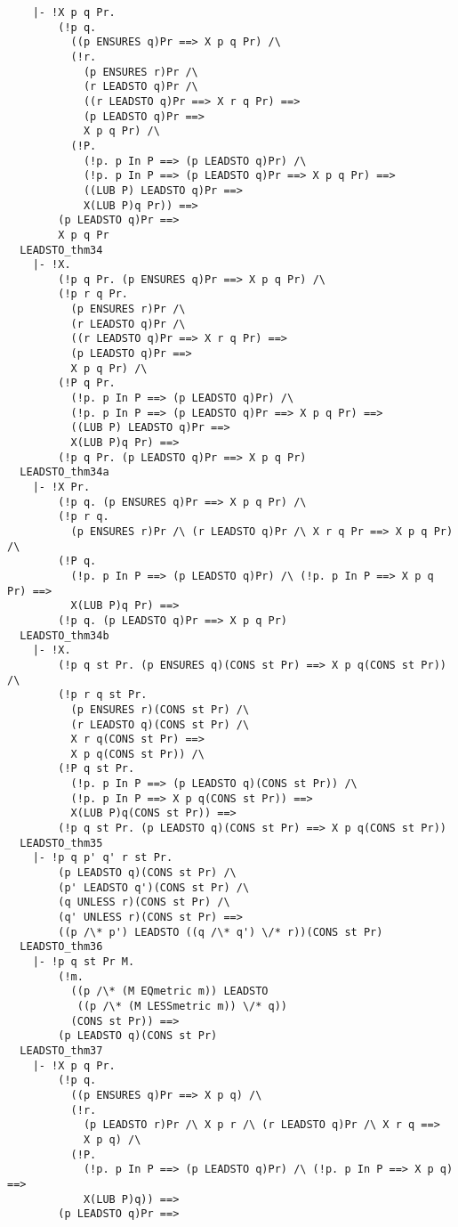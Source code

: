{\begin{verbatim}
    |- !X p q Pr.
        (!p q.
          ((p ENSURES q)Pr ==> X p q Pr) /\
          (!r.
            (p ENSURES r)Pr /\
            (r LEADSTO q)Pr /\
            ((r LEADSTO q)Pr ==> X r q Pr) ==>
            (p LEADSTO q)Pr ==>
            X p q Pr) /\
          (!P.
            (!p. p In P ==> (p LEADSTO q)Pr) /\
            (!p. p In P ==> (p LEADSTO q)Pr ==> X p q Pr) ==>
            ((LUB P) LEADSTO q)Pr ==>
            X(LUB P)q Pr)) ==>
        (p LEADSTO q)Pr ==>
        X p q Pr
  LEADSTO_thm34
    |- !X.
        (!p q Pr. (p ENSURES q)Pr ==> X p q Pr) /\
        (!p r q Pr.
          (p ENSURES r)Pr /\
          (r LEADSTO q)Pr /\
          ((r LEADSTO q)Pr ==> X r q Pr) ==>
          (p LEADSTO q)Pr ==>
          X p q Pr) /\
        (!P q Pr.
          (!p. p In P ==> (p LEADSTO q)Pr) /\
          (!p. p In P ==> (p LEADSTO q)Pr ==> X p q Pr) ==>
          ((LUB P) LEADSTO q)Pr ==>
          X(LUB P)q Pr) ==>
        (!p q Pr. (p LEADSTO q)Pr ==> X p q Pr)
  LEADSTO_thm34a
    |- !X Pr.
        (!p q. (p ENSURES q)Pr ==> X p q Pr) /\
        (!p r q.
          (p ENSURES r)Pr /\ (r LEADSTO q)Pr /\ X r q Pr ==> X p q Pr) /\
        (!P q.
          (!p. p In P ==> (p LEADSTO q)Pr) /\ (!p. p In P ==> X p q Pr) ==>
          X(LUB P)q Pr) ==>
        (!p q. (p LEADSTO q)Pr ==> X p q Pr)
  LEADSTO_thm34b
    |- !X.
        (!p q st Pr. (p ENSURES q)(CONS st Pr) ==> X p q(CONS st Pr)) /\
        (!p r q st Pr.
          (p ENSURES r)(CONS st Pr) /\
          (r LEADSTO q)(CONS st Pr) /\
          X r q(CONS st Pr) ==>
          X p q(CONS st Pr)) /\
        (!P q st Pr.
          (!p. p In P ==> (p LEADSTO q)(CONS st Pr)) /\
          (!p. p In P ==> X p q(CONS st Pr)) ==>
          X(LUB P)q(CONS st Pr)) ==>
        (!p q st Pr. (p LEADSTO q)(CONS st Pr) ==> X p q(CONS st Pr))
  LEADSTO_thm35
    |- !p q p' q' r st Pr.
        (p LEADSTO q)(CONS st Pr) /\
        (p' LEADSTO q')(CONS st Pr) /\
        (q UNLESS r)(CONS st Pr) /\
        (q' UNLESS r)(CONS st Pr) ==>
        ((p /\* p') LEADSTO ((q /\* q') \/* r))(CONS st Pr)
  LEADSTO_thm36
    |- !p q st Pr M.
        (!m.
          ((p /\* (M EQmetric m)) LEADSTO
           ((p /\* (M LESSmetric m)) \/* q))
          (CONS st Pr)) ==>
        (p LEADSTO q)(CONS st Pr)
  LEADSTO_thm37
    |- !X p q Pr.
        (!p q.
          ((p ENSURES q)Pr ==> X p q) /\
          (!r.
            (p LEADSTO r)Pr /\ X p r /\ (r LEADSTO q)Pr /\ X r q ==>
            X p q) /\
          (!P.
            (!p. p In P ==> (p LEADSTO q)Pr) /\ (!p. p In P ==> X p q) ==>
            X(LUB P)q)) ==>
        (p LEADSTO q)Pr ==>

\end{verbatim}}
